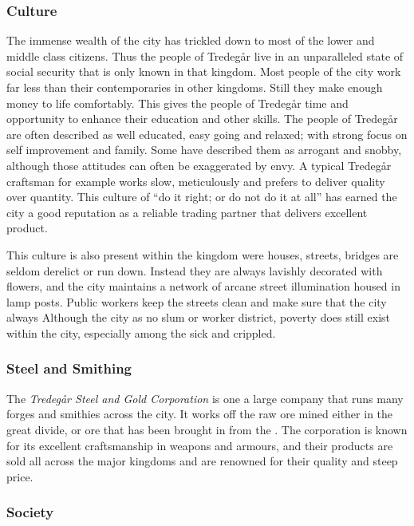 \subsubsection{Culture}

The immense wealth of the city has trickled down to most of the lower and middle
class citizens. Thus the people of Tredegår live in an unparalleled state of
social security that is only known in that kingdom. Most people of the city
work far less than their contemporaries in other kingdoms. Still they make
enough money to life comfortably. This gives the people of Tredegår time and
opportunity to enhance their education and other skills. The people of Tredegår
are often described as well educated, easy going and relaxed; with strong focus
on self improvement and family. Some have described them as arrogant and snobby,
although those attitudes can often be exaggerated by envy. A typical Tredegår
craftsman for example works slow, meticulously and prefers to deliver quality
over quantity. This culture of ``do it right; or do not do it at all'' has
earned the city a good reputation as a reliable trading partner that delivers
excellent product.

This culture is also present within the kingdom were houses, streets, bridges
are seldom derelict or run down. Instead they are always lavishly decorated with
flowers, and the city maintains a network of arcane street illumination housed
in lamp posts. Public workers keep the streets clean and make sure that the
city always Although the city as no slum or worker district, poverty does
still exist within the city, especially among the sick and crippled.

\subsubsection{Steel and Smithing}

The \emph{Tredegår Steel and Gold Corporation} is one a large company that
runs many forges and smithies across the city. It works off the raw ore mined
either in the great divide, or ore that has been brought in from the
. The corporation is known for its excellent
craftsmanship in weapons and armours, and their products are sold all across
the major kingdoms and are renowned for their quality and steep price.

\subsubsection{Society}

